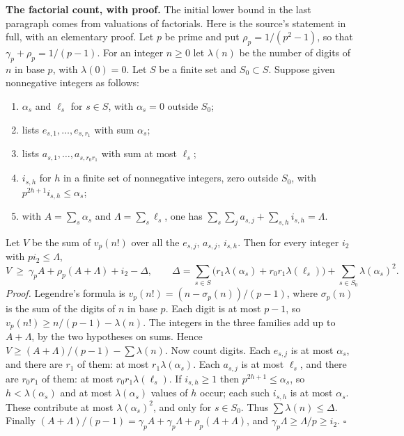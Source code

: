 \documentclass[11pt,letterpaper]{article}
\begin{document}
{\textbf{The factorial count, with proof.} The initial lower bound in the last paragraph comes from valuations of factorials. Here is the source's statement in full, with an elementary proof. Let $p$ be prime and put $\rho_p=1/(p^2-1)$, so that $\gamma_p+\rho_p=1/(p-1)$. For an integer $n\ge0$ let $\lambda(n)$ be the number of digits of $n$ in base $p$, with $\lambda(0)=0$. Let $S$ be a finite set and $S_0\subset S$. Suppose given nonnegative integers as follows:
\begin{enumerate}[label=(\roman*),leftmargin=2.6em,itemsep=0pt,topsep=2pt]
\item $\alpha_s$ and $\ell_s$ for $s\in S$, with $\alpha_s=0$ outside $S_0$;
\item lists $e_{s,1},\ldots,e_{s,r_1}$ with sum $\alpha_s$;
\item lists $a_{s,1},\ldots,a_{s,r_0r_1}$ with sum at most $\ell_s$;
\item $i_{s,h}$ for $h$ in a finite set of nonnegative integers, zero outside $S_0$, with $p^{2h+1}i_{s,h}\le\alpha_s$;
\item with $A=\sum_s\alpha_s$ and $\Lambda=\sum_s\ell_s$, one has $\sum_{s}\sum_j a_{s,j}+\sum_{s,h}i_{s,h}=\Lambda$.
\end{enumerate}
Let $V$ be the sum of $v_p(n!)$ over all the $e_{s,j}$, $a_{s,j}$, $i_{s,h}$. Then for every integer $i_2$ with $pi_2\le\Lambda$,
\begin{equation}\label{D:87}
 V\ \ge\ \gamma_pA+\rho_p(A+\Lambda)+i_2-\Delta,\qquad
 \Delta=\sum_{s\in S}\big(r_1\lambda(\alpha_s)+r_0r_1\lambda(\ell_s)\big)
        +\sum_{s\in S_0}\lambda(\alpha_s)^2 .                    \tag{6.1a}
\end{equation}
\emph{Proof.} Legendre's formula is $v_p(n!)=(n-\sigma_p(n))/(p-1)$, where $\sigma_p(n)$ is the sum of the digits of $n$ in base $p$. Each digit is at most $p-1$, so $v_p(n!)\ge n/(p-1)-\lambda(n)$. The integers in the three families add up to $A+\Lambda$, by the two hypotheses on sums. Hence $V\ge(A+\Lambda)/(p-1)-\sum\lambda(n)$. Now count digits. Each $e_{s,j}$ is at most $\alpha_s$, and there are $r_1$ of them: at most $r_1\lambda(\alpha_s)$. Each $a_{s,j}$ is at most $\ell_s$, and there are $r_0r_1$ of them: at most $r_0r_1\lambda(\ell_s)$. If $i_{s,h}\ge1$ then $p^{2h+1}\le\alpha_s$, so $h<\lambda(\alpha_s)$ and at most $\lambda(\alpha_s)$ values of $h$ occur; each such $i_{s,h}$ is at most $\alpha_s$. These contribute at most $\lambda(\alpha_s)^2$, and only for $s\in S_0$. Thus $\sum\lambda(n)\le\Delta$. Finally $(A+\Lambda)/(p-1)=\gamma_pA+\gamma_p\Lambda+\rho_p(A+\Lambda)$, and $\gamma_p\Lambda\ge\Lambda/p\ge i_2$. $\square$

}
\end{document}
